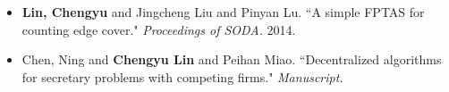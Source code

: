 \begin{itemize}
    \item {\bf Lin, Chengyu} and Jingcheng Liu and Pinyan Lu.
        ``A simple FPTAS for counting edge cover."
        \emph{Proceedings of SODA.} 2014.

    \item Chen, Ning and {\bf Chengyu Lin} and Peihan Miao.
        ``Decentralized algorithms for secretary problems with competing firms."
        \emph{Manuscript.}
\end{itemize}
